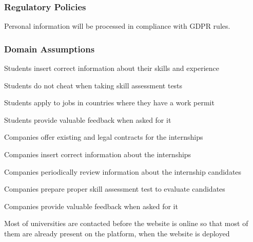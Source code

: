 
\subsubsection{Regulatory Policies}
    Personal information will be processed in compliance with GDPR rules.



\subsubsection{Domain Assumptions}
    \begin{enumerate}[label={[D\arabic*]}]
        \item {Students insert correct information about their skills and experience}
        \item {Students do not cheat when taking skill assessment tests}
        \item {Students apply to jobs in countries where they have a work permit}
        \item {Students provide valuable feedback when asked for it}
        \item {Companies offer existing and legal contracts for the internships}
        \item {Companies insert correct information about the internships}
        \item {Companies periodically review information about the internship candidates}
        \item {Companies prepare proper skill assessment test to evaluate candidates}
        \item {Companies provide valuable feedback when asked for it}
        \item {Most of universities are contacted before the website is online so that most of them are already present on the platform, when the website is deployed}
    \end{enumerate}